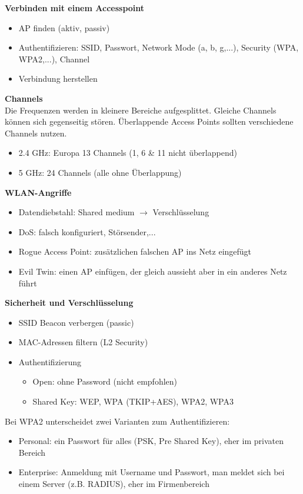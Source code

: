 \textbf{Verbinden mit einem Accesspoint}
\begin{itemize}
	\item AP finden (aktiv, passiv)
	\item Authentifizieren: SSID, Passwort, Network Mode (a, b, g,...), Security (WPA, WPA2,...), Channel\\
	\item Verbindung herstellen
\end{itemize}

\textbf{Channels} \\
Die Frequenzen werden in kleinere Bereiche aufgesplittet. Gleiche Channels können sich gegenseitig stören. Überlappende Access Points sollten verschiedene Channels nutzen.
\begin{itemize}
	\item 2.4 GHz: Europa 13 Channels (1, 6 \& 11 nicht überlappend)
	\item 5 GHz: 24 Channels (alle ohne Überlappung)
\end{itemize}

\textbf{WLAN-Angriffe}
\begin{itemize}
	\item Datendiebstahl: Shared medium $\rightarrow$ Verschlüsselung
	\item DoS: falsch konfiguriert, Störsender,...
	\item Rogue Access Point: zusätzlichen falschen AP ins Netz eingefügt
	\item Evil Twin: einen AP einfügen, der gleich aussieht aber in ein anderes Netz führt
\end{itemize}

\textbf{Sicherheit und Verschlüsselung}
\begin{itemize}
	\item SSID Beacon verbergen (passic)
	\item MAC-Adressen filtern (L2 Security)
	\item Authentifizierung
	\begin{itemize}
		\item Open: ohne Password (nicht empfohlen)
		\item Shared Key: WEP, WPA (TKIP+AES), WPA2, WPA3
	\end{itemize}
\end{itemize}

Bei WPA2 unterscheidet zwei Varianten zum Authentifizieren:
\begin{itemize}
	\item Personal: ein Passwort für alles (PSK, Pre Shared Key), eher im privaten Bereich
	\item Enterprise: Anmeldung mit Username und Passwort, man meldet sich bei einem Server (z.B. RADIUS), eher im Firmenbereich
\end{itemize}

